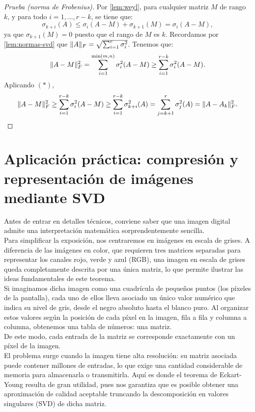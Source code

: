 \begin{proof}[Prueba (norma de Frobenius)]
	Por \cref{lem:weyl}, para cualquier matriz $M$ de rango $k$, y para todo $i = 1, \ldots, r - k$, se tiene que:
	\[ \sigma_{k+i}(A) \leq \sigma_i(A - M) + \sigma_{k+1}(M) = \sigma_i(A - M), \tag{$\ast$} \]
	ya que $\sigma_{k+1}(M) = 0$ puesto que el rango de $M$ es $k$. Recordamos por \cref{lem:normas-svd} que $\lVert A\rVert_F = \sqrt{\sum_{i=1}^{r} \sigma_i^2}$.
	Tenemos que:
	\[ \lVert A - M\rVert_F^2 = \sum_{i=1}^{\min(m,n)} \sigma_i^2(A - M) \geq \sum_{i=1}^{r-k} \sigma_i^2(A - M). \]
	Aplicando $(\ast)$,
	\[ \lVert A - M\rVert_F^2 \geq \sum_{i=1}^{r-k} \sigma_i^2(A - M) \geq \sum_{i=1}^{r-k} \sigma_{k+i}^2(A) = \sum_{j=k+1}^{r} \sigma_j^2(A) = \lVert A - A_k\rVert_F^2. \]
\end{proof}

\section{Aplicación práctica: compresión y representación de imágenes mediante SVD}
Antes de entrar en detalles técnicos, conviene saber que una imagen digital admite una interpretación matemática sorprendentemente sencilla.\\
Para simplificar la exposición, nos centraremos en imágenes en escala de grises. A diferencia de las imágenes en color, que requieren tres matrices separadas para representar los canales rojo, verde y azul (RGB), una imagen en escala de grises queda completamente descrita por una única matriz, lo que permite ilustrar las ideas fundamentales de este teorema.\\
Si imaginamos dicha imagen como una cuadrícula de pequeños puntos (los píxeles de la pantalla), cada uno de ellos lleva asociado un único valor numérico que indica su nivel de gris, desde el negro absoluto hasta el blanco puro. Al organizar estos valores según la posición de cada píxel en la imagen, fila a fila y columna a columna, obtenemos una tabla de números: una matriz.\\
De este modo, cada entrada de la matriz se corresponde exactamente con un píxel de la imagen.\\
El problema surge cuando la imagen tiene alta resolución: su matriz asociada puede contener millones de entradas, lo que exige una cantidad considerable de memoria para almacenarla o transmitirla. Aquí es donde el teorema de Eckart-Young resulta de gran utilidad, pues nos garantiza que es posible obtener una aproximación de calidad aceptable truncando la descomposición en valores singulares (SVD) de dicha matriz.\\
